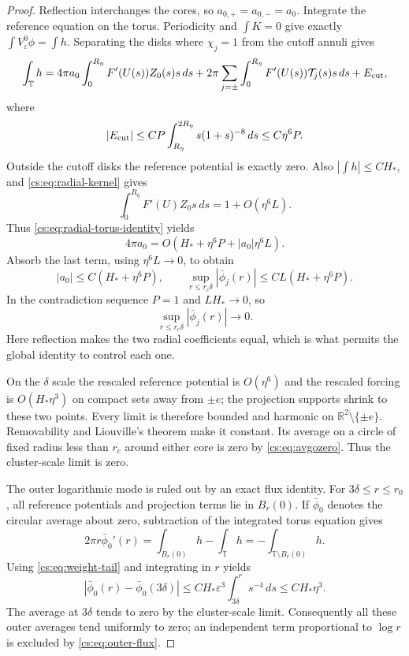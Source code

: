 \documentclass[11pt,reqno]{amsart}
\numberwithin{equation}{section}
\theoremstyle{definition}
\theoremstyle{remark}
\newcommand{\R}{\mathbb R}
\newcommand{\T}{\mathbb T}
\newcommand{\eps}{\varepsilon}
\begin{document}
\begin{proof}
Reflection interchanges the cores, so $a_{0,+}=a_{0,-}=a_0$.
Integrate the reference equation on the torus. Periodicity and
$\int K=0$ give exactly $\int V_\eps^0\phi=\int h$.
Separating the disks where $\chi_j=1$ from the cutoff annuli gives
\begin{equation}\label{cs:eq:radial-torus-identity}
 \int_\T h
   =4\pi a_0\int_0^{R_\eta}F'(U(s))Z_0(s)s\,ds
     +2\pi\sum_{j=\pm}\int_0^{R_\eta}
                     F'(U(s))\mathcal T_j(s)s\,ds+E_{\rm cut},
\end{equation}
where
\[
 |E_{\rm cut}|\le CP\int_{R_\eta}^{2R_\eta}s(1+s)^{-8}\,ds
       \le C\eta^6P.
\]
Outside the cutoff disks the reference potential is exactly zero.
Also $|\int h|\le CH_*$, and \eqref{cs:eq:radial-kernel} gives
\[
 \int_0^{R_\eta}F'(U)Z_0s\,ds=1+O(\eta^6L).
\]
Thus \eqref{cs:eq:radial-torus-identity} yields
\[
 4\pi a_0=O(H_*+\eta^6P+|a_0|\eta^6L).
\]
Absorb the last term, using $\eta^6L\to0$, to obtain
\begin{equation}\label{cs:eq:radial-quantitative}
 |a_0|\le C(H_*+\eta^6P),\qquad
 \sup_{r\le r_c\delta}|\bar\phi_j(r)|
       \le CL(H_*+\eta^6P).
\end{equation}
In the contradiction sequence $P=1$ and $LH_*\to0$, so
\begin{equation}\label{cs:eq:avgozero}
 \sup_{r\le r_c\delta}|\bar\phi_j(r)|\longrightarrow0.
\end{equation}
Here reflection makes the two radial coefficients equal, which is
what permits the global identity to control each one.

On the $\delta$ scale the rescaled reference potential is
$O(\eta^6)$ and the rescaled forcing is $O(H_*\eta^3)$ on compact
sets away from $\pm e$; the projection supports shrink to these
two points. Every limit is therefore bounded and harmonic on
$\R^2\setminus\{\pm e\}$. Removability and Liouville's theorem
make it constant. Its average on a circle of fixed radius less
than $r_c$ around either core is zero by \eqref{cs:eq:avgozero}.
Thus the cluster-scale limit is zero.

The outer logarithmic mode is ruled out by an exact flux identity.
For $3\delta\le r\le r_0$, all reference potentials and projection
terms lie in $B_r(0)$. If $\bar\phi_0$ denotes the circular average
about zero, subtraction of the integrated torus equation gives
\begin{equation}\label{cs:eq:outer-flux}
 2\pi r\bar\phi_0'(r)
      =\int_{B_r(0)}h-\int_\T h
      =-\int_{\T\setminus B_r(0)}h.
\end{equation}
Using \eqref{cs:eq:weight-tail} and integrating in $r$ yields
\begin{equation}\label{cs:eq:outer-average}
 |\bar\phi_0(r)-\bar\phi_0(3\delta)|
     \le CH_*\eps^3\int_{3\delta}^{r}s^{-4}\,ds
     \le CH_*\eta^3.
\end{equation}
The average at $3\delta$ tends to zero by the cluster-scale limit.
Consequently all these outer averages tend uniformly to zero;
an independent term proportional to $\log r$ is excluded by
\eqref{cs:eq:outer-flux}.


\end{proof}
\end{document}

